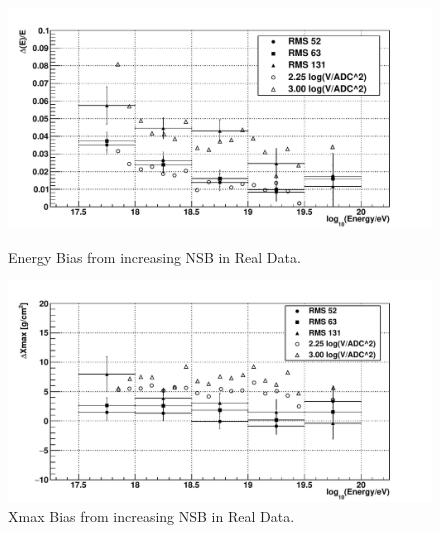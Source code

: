 \begin{figure}
\centering
\includegraphics[width=\textwidth]{chapters/graphs/SelectionEff/Smearing_RealData_EnergyBias.pdf}
\caption{Energy Bias from increasing NSB in Real Data.}
\vspace{3mm}
\includegraphics[width=\textwidth]{chapters/graphs/SelectionEff/Smearing_RealData_XmaxBias.pdf}
\caption{Xmax Bias from increasing NSB in Real Data.}
\end{figure}

